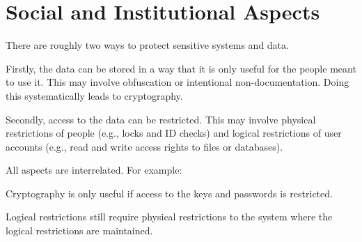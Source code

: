 \section{Social and Institutional Aspects}

There are roughly two ways to protect sensitive systems and data.

Firstly, the data can be stored in a way that it is only useful for the people meant to use it.
This may involve obfuscation or intentional non-documentation. Doing this systematically leads to cryptography.

Secondly, access to the data can be restricted.
This may involve physical restrictions of people (e.g., locks and ID checks) and logical restrictions of user accounts (e.g., read and write access rights to files or databases).

All aspects are interrelated.
For example:
\begin{compactitem}
  \item Cryptography is only useful if access to the keys and passwords is restricted.
  \item Logical restrictions still require physical restrictions to the system where the logical restrictions are maintained.
\end{compactitem}
\medskip

